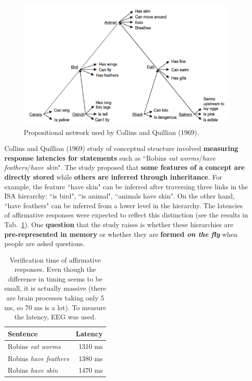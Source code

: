\begin{figure}
    \centering
    \includegraphics[width=0.7\linewidth]{images/animal_pn.png}
    \caption{Propositional network used by Collins and Quillian (1969).}
    \label{fig:animal_pn}
\end{figure}
Collins and Quillian (1969) study of conceptual structure involved \textbf{measuring response latencies for statements} such as ``Robins \textit{eat worms}/\textit{have feathers}/\textit{have skin}". The study proposed that \textbf{some features of a concept are directly stored} while \textbf{others are inferred through inheritance}. For example, the feature ``have skin" can be inferred after traversing three links in the ISA hierarchy: ``is bird", ``is animal", ``animals have skin". On the other hand, ``have feathers" can be inferred from a lower level in the hierarchy.
The latencies of affirmative responses were expected to reflect this distinction (see the results in Tab.~\ref{tab:collins}). One \textbf{question} that the study raises is whether these hierarchies are \textbf{pre-represented in memory} or whether they are \textbf{formed \textit{on the fly}} when people are asked questions.\\

\begin{table}[t]
    \centering
    \captionsetup{width=.8\linewidth}
    \begin{tabular}{lr}
        \hline
        Sentence & Latency \\
        \hline
        Robins \textit{eat worms} & 1310 ms \\
        Robins \textit{have feathers} & 1380 ms \\
        Robins \textit{have skin} & 1470 ms \\
        \hline
    \end{tabular}
    \caption{Verification time of affirmative responses. Even though the difference in timing seems to be small, it is actually massive (there are brain processes taking only 5 ms, so 70 ms is a lot). To measure the latency, EEG was used.}
    \label{tab:collins}
\end{table}


